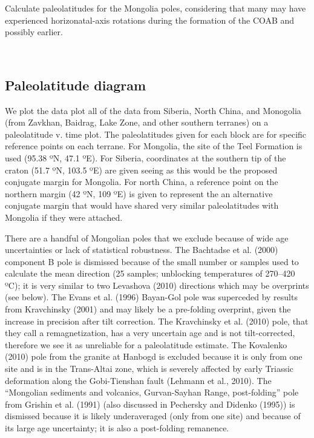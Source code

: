\documentclass[11pt]{article}
\begin{document}
    Calculate paleolatitudes for the Mongolia poles, considering that many
may have experienced horizonatal-axis rotations during the formation of
the COAB and possibly earlier.



    \begin{center}
    \end{center}
    { \hspace*{\fill} \\}
    
    \subsection{Paleolatitude diagram}\label{paleolatitude-diagram}

    We plot the data plot all of the data from Siberia, North China, and
Monogolia (from Zavkhan, Baidrag, Lake Zone, and other southern
terranes) on a paleolatitude v. time plot. The paleolatitudes given for
each block are for specific reference points on each terrane. For
Mongolia, the site of the Teel Formation is used (95.38 ºN, 47.1 ºE).
For Siberia, coordinates at the southern tip of the craton (51.7 ºN,
103.5 ºE) are given seeing as this would be the proposed conjugate
margin for Mongolia. For north China, a reference point on the northern
margin (42 ºN, 109 ºE) is given to represent the an alternative
conjugate margin that would have shared very similar paleolatitudes with
Mongolia if they were attached.

    There are a handful of Mongolian poles that we exclude because of wide
age uncertainties or lack of statistical robustness. The Bachtadse et
al. (2000) component B pole is dismissed because of the small number or
samples used to calculate the mean direction (25 samples; unblocking
temperatures of 270--420 ºC); it is very similar to two Levashova (2010)
directions which may be overprints (see below). The Evans et al. (1996)
Bayan-Gol pole was superceded by results from Kravchinsky (2001) and may
likely be a pre-folding overprint, given the increase in precision after
tilt correction. The Kravchinsky et al. (2010) pole, that they call a
remagnetization, has a very uncertain age and is not tilt-corrected,
therefore we see it as unreliable for a paleolatitude estimate. The
Kovalenko (2010) pole from the granite at Hanbogd is excluded because it
is only from one site and is in the Trans-Altai zone, which is severely
affected by early Triassic deformation along the Gobi-Tienshan fault
(Lehmann et al., 2010). The ``Mongolian sediments and volcanics,
Gurvan-Sayhan Range, post-folding'' pole from Grishin et al. (1991)
(also discussed in Pechersky and Didenko (1995)) is dismissed because it
is likely underaveraged (only from one site) and because of its large
age uncertainty; it is also a post-folding remanence.
\end{document}
